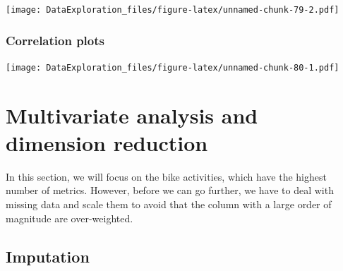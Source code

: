 \documentclass[
]{book}
\newenvironment{Shaded}{\begin{snugshade}}{\end{snugshade}}
\newcommand{\CommentTok}[1]{\textcolor[rgb]{0.56,0.35,0.01}{\textit{#1}}}
\newcommand{\DataTypeTok}[1]{\textcolor[rgb]{0.13,0.29,0.53}{#1}}
\newcommand{\KeywordTok}[1]{\textcolor[rgb]{0.13,0.29,0.53}{\textbf{#1}}}
\newcommand{\NormalTok}[1]{#1}
\newcommand{\OperatorTok}[1]{\textcolor[rgb]{0.81,0.36,0.00}{\textbf{#1}}}
\newcommand{\StringTok}[1]{\textcolor[rgb]{0.31,0.60,0.02}{#1}}
\begin{document}
\begin{Shaded}
\end{Shaded}

\texttt{[image: DataExploration\_files/figure-latex/unnamed-chunk-79-2.pdf]}

\hypertarget{correlation-plots}{%
\subsubsection{Correlation plots}\label{correlation-plots}}

\begin{Shaded}
\end{Shaded}

\texttt{[image: DataExploration\_files/figure-latex/unnamed-chunk-80-1.pdf]}

\hypertarget{multivariate-analysis-and-dimension-reduction-1}{%
\section{Multivariate analysis and dimension reduction}\label{multivariate-analysis-and-dimension-reduction-1}}

In this section, we will focus on the bike activities, which have the highest number of metrics. However, before we can go further, we have to deal with missing data and scale them to avoid that the column with a large order of magnitude are over-weighted.

\hypertarget{imputation}{%
\subsection{Imputation}\label{imputation}}
\end{document}

